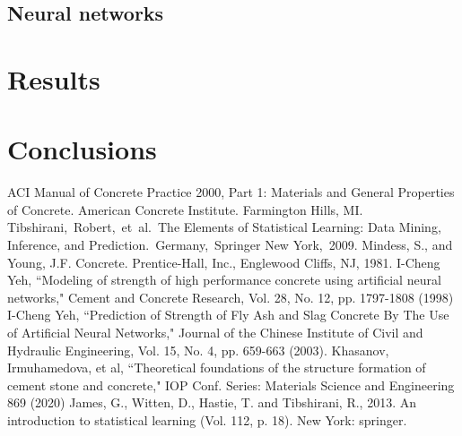 \documentclass[conference]{IEEEtran}
\begin{document}
\subsection{Neural networks}


\section{Results} \label{sec:results}






\section{Conclusions}\label{sec:conclusions}


\begin{thebibliography}{00}
 ACI Manual of Concrete Practice 2000, Part 1: Materials and General Properties of Concrete.  American Concrete Institute.  Farmington Hills, MI.
 Tibshirani, Robert, et al. The Elements of  Statistical Learning:  Data Mining, Inference, and Prediction. Germany, Springer New York, 2009.
 Mindess, S., and Young, J.F. Concrete. Prentice-Hall, Inc., Englewood Cliffs, NJ, 1981.
 I-Cheng Yeh, ``Modeling of strength of high performance concrete using artificial neural networks," Cement and Concrete Research, Vol. 28, No. 12, pp. 1797-1808 (1998)
 I-Cheng Yeh, ``Prediction of Strength of Fly Ash and Slag Concrete By The Use of Artificial Neural Networks," Journal of the Chinese Institute of Civil and Hydraulic Engineering, Vol. 15, No. 4, pp. 659-663 (2003). 
 Khasanov, Irmuhamedova, et al, ``Theoretical foundations of the structure formation of cement stone
and concrete," IOP Conf. Series: Materials Science and Engineering 869 (2020)
 James, G., Witten, D., Hastie, T. and Tibshirani, R., 2013. An introduction to statistical learning (Vol. 112, p. 18). New York: springer.

\end{thebibliography}
\end{document}
